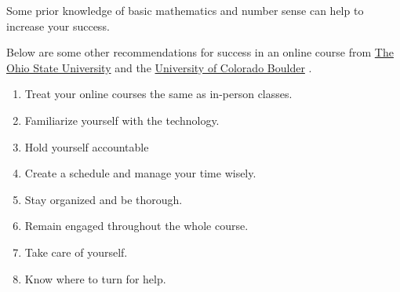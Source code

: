 \documentclass[11pt]{article}
\begin{document}
Some prior knowledge of basic mathematics and number sense can help to increase your success.

Below are some other recommendations for success in an online course from \href{https://online.osu.edu/resources/learn/5-online-learning-tips-student-success}{The Ohio State University} and the \href{https://www.colorado.edu/health/tips-succeeding-online-classes}{University of Colorado Boulder} .

\begin{enumerate}
\item Treat your online courses the same as in-person classes.
\item Familiarize yourself with the technology.
\item Hold yourself accountable
\item Create a schedule and manage your time wisely.
\item Stay organized and be thorough.
\item Remain engaged throughout the whole course.
\item Take care of yourself.
\item Know where to turn for help.
\end{enumerate}
\end{document}
